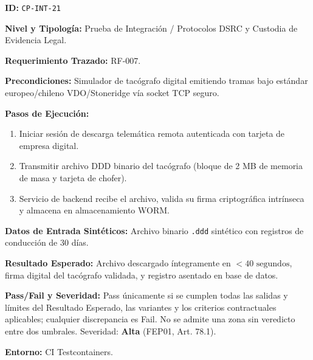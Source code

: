 \par\noindent\textbf{ID:} \texttt{C\allowbreak{}P\allowbreak{}-\allowbreak{}I\allowbreak{}N\allowbreak{}T\allowbreak{}-\allowbreak{}2\allowbreak{}1\allowbreak{}}\par
\par\noindent\textbf{Nivel y Tipología:} Prueba de Integración / Protocolos DSRC y Custodia de Evidencia Legal.\par
\par\noindent\textbf{Requerimiento Trazado:} RF-007.\par
\par\noindent\textbf{Precondiciones:} Simulador de tacógrafo digital emitiendo tramas bajo estándar europeo/chileno VDO/Stoneridge vía socket TCP seguro.\par
\par\noindent\textbf{Pasos de Ejecución:} \par
\begin{enumerate}
\item Iniciar sesión de descarga telemática remota autenticada con tarjeta de empresa digital.
\item Transmitir archivo DDD binario del tacógrafo (bloque de 2 MB de memoria de masa y tarjeta de chofer).
\item Servicio de backend recibe el archivo, valida su firma criptográfica intrínseca y almacena en almacenamiento WORM.
\end{enumerate}
\par\noindent\textbf{Datos de Entrada Sintéticos:} Archivo binario \texttt{.\allowbreak{}d\allowbreak{}d\allowbreak{}d\allowbreak{}} sintético con registros de conducción de 30 días.\par
\par\noindent\textbf{Resultado Esperado:} Archivo descargado íntegramente en \(< 40\text{ segundos}\), firma digital del tacógrafo validada, y registro asentado en base de datos.\par
\par\noindent\textbf{Pass/Fail y Severidad:} Pass únicamente si se cumplen todas las salidas y límites del Resultado Esperado, las variantes y los criterios contractuales aplicables; cualquier discrepancia es Fail. No se admite una zona sin veredicto entre dos umbrales. Severidad: \textbf{Alta} (FEP01, Art. 78.1).\par
\par\noindent\textbf{Entorno:} CI Testcontainers.\par







